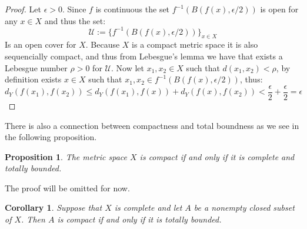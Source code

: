 \documentclass[11pt,a4paper]{article}
\theoremstyle{definition}
\theoremstyle{plain}
\newtheorem{proposition}[theorem]{Proposition}
\newtheorem{corollary}[theorem]{Corollary}
\begin{document}
	\begin{proof}
		Let $\epsilon > 0$. Since $f$ is continuous the set 
		$f^{-1}(B(f(x),\epsilon/2))$ is open for any $x \in X$ and thus
		the set:
		\[
			\mathcal{U} := \{f^{-1}(B(f(x),\epsilon/2))\}_{x \in X}
		\]
		Is an open cover for $X$. Because $X$ is a compact metric space
		it is also sequencially compact, and thus from Lebesgue's lemma
		we have that exists a Lebesgue number $\rho > 0$ for $\mathcal{U}$.
		Now let $x_1,x_2 \in X$ such that $d(x_1,x_2) < \rho$, by definition
		exists $x \in X$ such that $x_1,x_2 \in f^{-1}(B(f(x),\epsilon/2))$,
		thus:
		\[
			d_Y(f(x_1),f(x_2)) \le d_Y(f(x_1),f(x)) + d_Y(f(x),f(x_2)) <
			\frac{\epsilon}{2} + \frac{\epsilon}{2} = \epsilon
		\]
	\end{proof}
	There is also a connection between compactness and total boundness as
	we see in the following proposition.
	\begin{proposition}
		The metric space $X$ is compact if and only if it is complete
		and totally bounded.
	\end{proposition}
	The proof will be omitted for now.
	\begin{corollary}
		Suppose that $X$ is complete and let $A$ be a nonempty closed subset
		of $X$. Then $A$ is compact if and only if it is totally bounded.
	\end{corollary}
	
	\newpage
	
\end{document}
